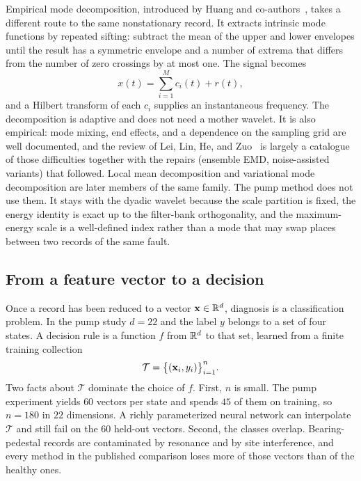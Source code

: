 Empirical mode decomposition, introduced by Huang and co-authors~\cite{huang1998}, takes a different route to the same nonstationary record.
It extracts intrinsic mode functions by repeated sifting: subtract the mean of the upper and lower envelopes until the result has a symmetric envelope and a number of extrema that differs from the number of zero crossings by at most one.
The signal becomes
\begin{equation}
x(t)=\sum_{i=1}^{M} c_{i}(t)+r(t),
\label{eq:emd}
\end{equation}
and a Hilbert transform of each \(c_{i}\) supplies an instantaneous frequency.
The decomposition is adaptive and does not need a mother wavelet.
It is also empirical: mode mixing, end effects, and a dependence on the sampling grid are well documented, and the review of Lei, Lin, He, and Zuo~\cite{lei2013} is largely a catalogue of those difficulties together with the repairs (ensemble EMD, noise-assisted variants) that followed.
Local mean decomposition and variational mode decomposition are later members of the same family.
The pump method does not use them.
It stays with the dyadic wavelet because the scale partition is fixed, the energy identity is exact up to the filter-bank orthogonality, and the maximum-energy scale is a well-defined index rather than a mode that may swap places between two records of the same fault.

\subsection{From a feature vector to a decision}

Once a record has been reduced to a vector \(\mathbf{x}\in\mathbb{R}^{d}\), diagnosis is a classification problem.
In the pump study \(d=22\) and the label \(y\) belongs to a set of four states.
A decision rule is a function \(f\) from \(\mathbb{R}^{d}\) to that set, learned from a finite training collection
\begin{equation}
\mathcal{T}=\bigl\{(\mathbf{x}_{i}, y_{i})\bigr\}_{i=1}^{n}.
\label{eq:trainingset}
\end{equation}
Two facts about \(\mathcal{T}\) dominate the choice of \(f\).
First, \(n\) is small.
The pump experiment yields \(60\) vectors per state and spends \(45\) of them on training, so \(n=180\) in \(22\) dimensions.
A richly parameterized neural network can interpolate \(\mathcal{T}\) and still fail on the \(60\) held-out vectors.
Second, the classes overlap.
Bearing-pedestal records are contaminated by resonance and by site interference, and every method in the published comparison loses more of those vectors than of the healthy ones.

